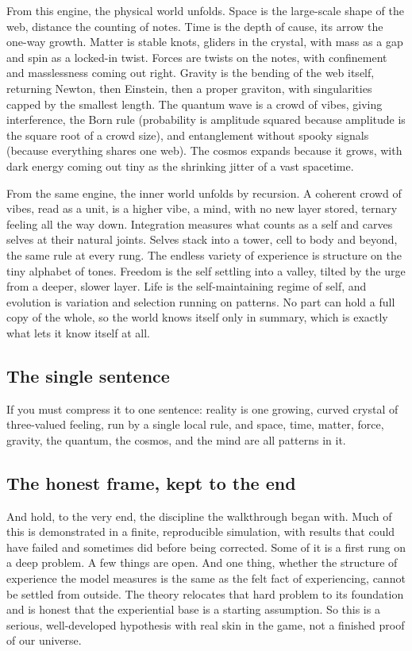 From this engine, the physical world unfolds. Space is the large-scale shape of the web, distance the counting of notes. Time is the depth of cause, its arrow the one-way growth. Matter is stable knots, gliders in the crystal, with mass as a gap and spin as a locked-in twist. Forces are twists on the notes, with confinement and masslessness coming out right. Gravity is the bending of the web itself, returning Newton, then Einstein, then a proper graviton, with singularities capped by the smallest length. The quantum wave is a crowd of vibes, giving interference, the Born rule (probability is amplitude squared because amplitude is the square root of a crowd size), and entanglement without spooky signals (because everything shares one web). The cosmos expands because it grows, with dark energy coming out tiny as the shrinking jitter of a vast spacetime.

From the same engine, the inner world unfolds by recursion. A coherent crowd of vibes, read as a unit, is a higher vibe, a mind, with no new layer stored, ternary feeling all the way down. Integration measures what counts as a self and carves selves at their natural joints. Selves stack into a tower, cell to body and beyond, the same rule at every rung. The endless variety of experience is structure on the tiny alphabet of tones. Freedom is the self settling into a valley, tilted by the urge from a deeper, slower layer. Life is the self-maintaining regime of self, and evolution is variation and selection running on patterns. No part can hold a full copy of the whole, so the world knows itself only in summary, which is exactly what lets it know itself at all.

\subsection{The single sentence}

If you must compress it to one sentence: reality is one growing, curved crystal of three-valued feeling, run by a single local rule, and space, time, matter, force, gravity, the quantum, the cosmos, and the mind are all patterns in it.

\subsection{The honest frame, kept to the end}

And hold, to the very end, the discipline the walkthrough began with. Much of this is demonstrated in a finite, reproducible simulation, with results that could have failed and sometimes did before being corrected. Some of it is a first rung on a deep problem. A few things are open. And one thing, whether the structure of experience the model measures is the same as the felt fact of experiencing, cannot be settled from outside. The theory relocates that hard problem to its foundation and is honest that the experiential base is a starting assumption. So this is a serious, well-developed hypothesis with real skin in the game, not a finished proof of our universe.

